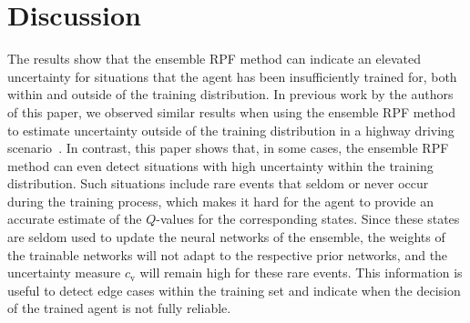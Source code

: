 \section{Discussion}
\label{sec:discussion}






The results show that the ensemble RPF method can indicate an elevated uncertainty for situations that the agent has been insufficiently trained for, both within and outside of the training distribution.
In previous work by the authors of this paper, we observed similar results when using the ensemble RPF method to estimate uncertainty outside of the training distribution in a highway driving scenario~\cite{Hoel2020}. In contrast, this paper shows that, in some cases, the ensemble RPF method can even detect situations with high uncertainty within the training distribution. Such situations include rare events that seldom or never occur during the training process, which makes it hard for the agent to provide an accurate estimate of the $Q$-values for the corresponding states. Since these states are seldom used to update the neural networks of the ensemble, the weights of the trainable networks will not adapt to the respective prior networks, and the uncertainty measure $c_\mathrm{v}$ will remain high for these rare events. This information is useful to detect edge cases within the training set and indicate when the decision of the trained agent is not fully reliable.

